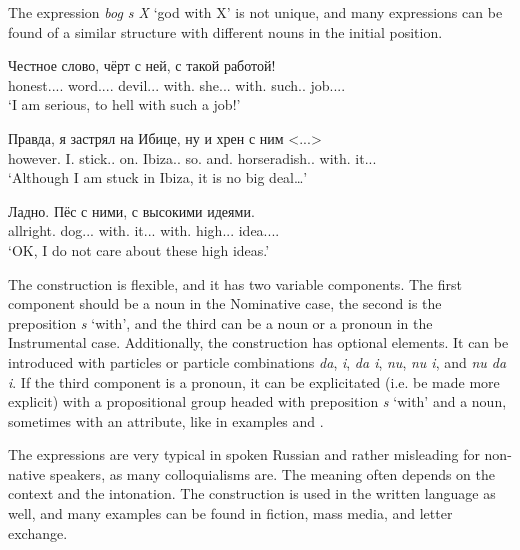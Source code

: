 \documentclass[output=paper]{langscibook}
\begin{document}
The expression \textit{bog s X} ‘god with X’ is not unique, and many expressions can be found of a similar structure with different nouns in the initial position.


\ea\label{ex:mikhailov:4}
\ea\label{ex:mikhailov:4a}
\gll  Честное слово, чёрт с ней, с такой работой!\\
     honest.{\ADJ}.{\NEUT}.{\NOM}.{\SG} word.{\NOUN}.{\NEUT}.{\NOM}.{\SG} devil.{\NOUN}{\glossM}.{\NOM}.{\SG} with.{\PREP} she.{\PRON}{\glossF}.{\INSTR}.{\SG} with.{\PREP} such.{\PRON}.{\INSTR} job.{\NOUN}.{\glossF}.{\INSTR}.{\SG}\\
\glt `I am serious, to hell with such a job!'

\ex
\gll Правда, я застрял на Ибице, ну и хрен с ним <...>\\
     however.{\ADV} \textsc{I.{\PRON}} stick.{\PAST}.{\glossM}{\SG} on.{\PREP} Ibiza.{\NOUNPROPER}.{\LOC} so.{\PTCP} and.{\PTCP} horseradish.{\NOUN}.{\NOM} with.{\PREP} it.{\PRON}.{\INSTR}.{\SG}\\
\glt `Although I am stuck in Ibiza, it is no big deal…'

\ex\label{ex:mikhailov:4c}
\gll Ладно. Пёс с ними, с высокими идеями.\\
     allright.{\ADV} dog.{\NOUN}{\glossM}.{\NOM}.{\SG} with.{\PREP} it.{\PRON}.{\PL}.{\INSTR} with.{\PREP} high.{\ADJ}.{\PL}.{\INSTR} idea.{\NOUN}.{\glossF}.{\PL}.{\INSTR}\\
\glt `OK, I do not care about these high ideas.'
\z
\z

The construction is flexible, and it has two variable components. The first component should be a noun in the Nominative case, the second is the preposition \textit{s} ‘with’, and the third can be a noun or a pronoun in the Instrumental case. Additionally, the construction has optional elements. It can be introduced with particles or particle combinations \textit{da}, \textit{i}, \textit{da i}, \textit{nu}, \textit{nu i}, and \textit{nu da i}. If the third component is a pronoun, it can be explicitated (i.e. be made more explicit) with a propositional group headed with preposition \textit{s} ‘with’ and a noun, sometimes with an attribute, like in examples  and .

The expressions are very typical in spoken Russian and rather misleading for non-native speakers, as many colloquialisms are. The meaning often depends on the context and the intonation. The construction is used in the written language as well, and many examples can be found in fiction, mass media, and letter exchange.
\end{document}
